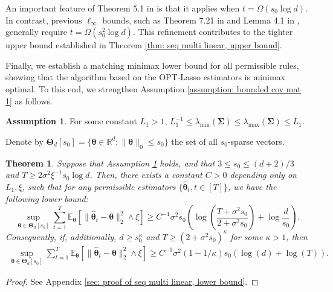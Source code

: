 \documentclass[aos,preprint]{imsart}
\theoremstyle{plain}
\newtheorem{theorem}{Theorem}
\theoremstyle{definition}
\newtheorem{assumption}{Assumption}
\newcommand{\bTheta}{\boldsymbol{\Theta}}
\newcommand{\btheta}{\boldsymbol{\theta}}
\newcommand{\hbtheta}{\widehat{\boldsymbol{\theta}}}
\newcommand{\bSigma}{\boldsymbol{\Sigma}}
\newcommand{\lmin}[1]{\lambda_{\min}\left(#1\right)}
\newcommand{\lmax}[1]{\lambda_{\max}\left(#1\right)}
\newcommand{\mR}{\mathbb{R}}
\newcommand{\Exp}{\mathbb{E}}
\begin{document}
An important feature of Theorem 5.1 in \cite{bellec2022biasing} is that it applies when $t = \Omega(s_0\log d)$. In contrast, previous $\ell_{\infty}$ bounds, such as Theorem 7.21 in \cite{wainwright2019high} and Lemma 4.1 in \cite{van2016estimation}, generally require $t = \Omega(s_0^2\log d)$. This refinement contributes to the tighter upper bound established in Theorem \ref{thm: seq multi linear, upper bound}.






Finally, we establish a matching minimax lower bound for all permissible rules, showing that the algorithm based on the OPT-Lasso estimators is minimax optimal. To this end, we strengthen Assumption \ref{assumption: bounded cov mat 1} as follows.

\begin{assumption}\label{assumption: bounded cov mat 1'}
For some constant $L_1 > 1$, 
$L_1^{-1}\le \lmin{\bSigma}\le\lmax{\bSigma}\le L_1$. 
\end{assumption}

Denote by $\bTheta_d[s_0]=\{\btheta\in \mR^d: \|\btheta\|_0\leq s_0\}$ the set of all $s_0$-sparse vectors.

\begin{theorem}\label{thm: seq multi linear, lower bound}
Suppose that Assumption \ref{assumption: bounded cov mat 1'} holds, and that $3 \leq s_0 \leq (d+2)/3$ and $T\ge 2\sigma^2 \xi^{-1}s_0\log d$. 
 Then, there exists a constant $C>0$ depending only on $L_1, \xi$, such that for any permissible estimators $\{\hbtheta_t, t\in [T]\}$, we have the following lower bound:
$$\sup_{\btheta\in \bTheta_d[s_0]} \sum_{t=1}^{T} \Exp_{\btheta} \left[\|\hbtheta_t-\btheta\|_2^2\wedge \xi \right] \ge C^{-1} \sigma^2 s_0 \left(\log\left( \frac{T+\sigma^2 s_0}{2+\sigma^2s_0} \right)+ \log\frac{d}{s_0} \right).
$$
Consequently, if, additionally, $d \geq s_0^{\kappa}$ and $T \geq (2+\sigma^2 s_0)^{\kappa}$ for some $\kappa > 1$, then 
\begin{align*}
    \sup_{\btheta\in \bTheta_d[s_0]} \sum_{t=1}^{T} \Exp_{\btheta} \left[\|\hbtheta_t-\btheta\|_2^2\wedge \xi \right] \ge C^{-1} \sigma^2  (1-1/\kappa) s_0\left(\log\left( d\right)+ \log\left(T\right) \right).
\end{align*}
\end{theorem}
\begin{proof}
See Appendix \ref{sec: proof of seq multi linear, lower bound}.
\end{proof}
\end{document}
